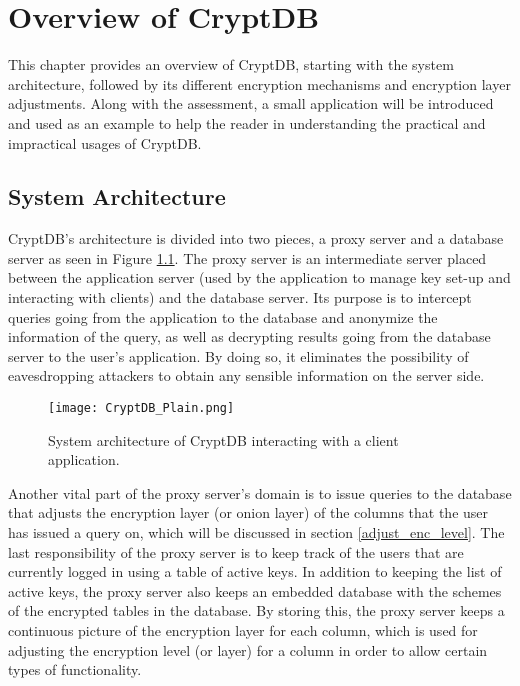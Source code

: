 \chapter{Overview of CryptDB}
\label{chp:overview_cryptDB}

This chapter provides an overview of CryptDB, starting with the system architecture, followed by its different encryption mechanisms and encryption layer adjustments. Along with the assessment, a small application will be introduced and used as an example to help the reader in understanding the practical and impractical usages of CryptDB.

\section{System Architecture}
\label{sec:sysarc}

CryptDB's architecture is divided into two pieces, a proxy server and a database server as seen in Figure \ref{cryptdb_plain}. The proxy server is an intermediate server placed between the application server (used by the application to manage key set-up and interacting with clients) and the database server. Its purpose is to intercept queries going from the application to the database and anonymize the information of the query, as well as decrypting results going from the database server to the user's application. By doing so, it eliminates the possibility of eavesdropping attackers to obtain any sensible information on the server side.

\begin{figure}[H]
	\texttt{[image: CryptDB\_Plain.png]}
	\caption{System architecture of CryptDB interacting with a client application.}
	\label{cryptdb_plain}
\end{figure}

Another vital part of the proxy server's domain is to issue queries to the database that adjusts the encryption layer (or onion layer) of the columns that the user has issued a query on, which will be discussed in section \ref{adjust_enc_level}. The last responsibility of the proxy server is to keep track of the users that are currently logged in using a table of active keys. In addition to keeping the list of active keys, the proxy server also keeps an embedded database with the schemes of the encrypted tables in the database. By storing this, the proxy server keeps a continuous picture of the encryption layer for each column, which is used for adjusting the encryption level (or layer) for a column in order to allow certain types of functionality.


